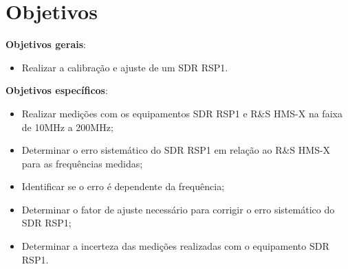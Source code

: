 \chapter{Objetivos}

\textbf{Objetivos gerais}: 
\begin{itemize}
    \item Realizar a calibração e ajuste de um SDR RSP1.
\end{itemize}



\textbf{Objetivos específicos}:
\begin{itemize}
\item Realizar medições com os equipamentos SDR RSP1 e R\&S HMS-X na faixa de 10MHz a 200MHz;
\item Determinar o erro sistemático do SDR RSP1 em relação ao R\&S HMS-X para as frequências medidas;
\item Identificar se o erro é dependente da frequência;
\item Determinar o fator de ajuste necessário para corrigir o erro sistemático do SDR RSP1;
\item Determinar a incerteza das medições realizadas com o equipamento SDR RSP1.
\end{itemize}




